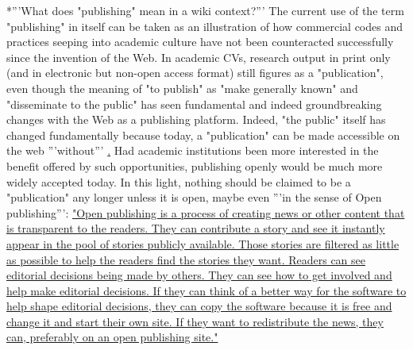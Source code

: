 \documentclass[final,authoryear,3p]{elsarticle-open-drafting}
\begin{document}
*'''What does "publishing" mean in a wiki context?''' The current use of the term "publishing" in itself can be taken as an illustration of how commercial codes and practices seeping into academic culture have not been counteracted successfully since the invention of the Web. In academic CVs, research output in print only (and in electronic but non-open access format) still figures as a "publication", even though the meaning of "to publish" as "make generally known" and "disseminate to the public" has seen fundamental and indeed groundbreaking changes with the Web as a publishing platform. Indeed, "the public" itself has changed fundamentally because today, a "publication" can be made accessible on the web '''without''' \href{http://scientopia.org/blogs/bookoftrogool/2010/03/15/battle-of-the-opens/ "a subscription, per-article, or other fee ... by the reader or the reader's proxy (e.g. a library)"}. Had academic institutions been more interested in the benefit offered by such opportunities, publishing openly would be much more widely accepted today. In this light, nothing should be claimed to be a "publication" any longer unless it is open, maybe even '''in the sense of Open publishing''': \href{http://en.wikipedia.org/w/index.php?title=Special:Cite&page=Open_publishing&id=383242580}{"Open publishing is a process of creating news or other content that is transparent to the readers. They can contribute a story and see it instantly appear in the pool of stories publicly available. Those stories are filtered as little as possible to help the readers find the stories they want. Readers can see editorial decisions being made by others. They can see how to get involved and help make editorial decisions. If they can think of a better way for the software to help shape editorial decisions, they can copy the software because it is free and change it and start their own site. If they want to redistribute the news, they can, preferably on an open publishing site."}
\end{document}

